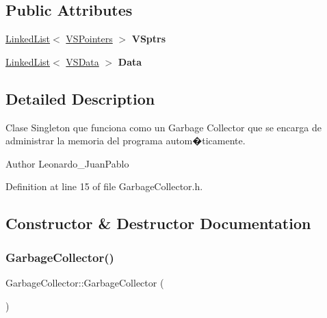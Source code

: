 \subsection*{Public Attributes}
\begin{DoxyCompactItemize}
\item 
\mbox{\label{class_garbage_collector_a1dddd648ec8351fd37c94e8b477f1971}} 
\hyperlink{class_linked_list}{Linked\+List}$<$ \hyperlink{struct_v_s_pointers}{V\+S\+Pointers} $>$ {\bfseries V\+Sptrs}
\item 
\mbox{\label{class_garbage_collector_a03fcd944fc7226109c8aa2a8ab96a741}} 
\hyperlink{class_linked_list}{Linked\+List}$<$ \hyperlink{struct_v_s_data}{V\+S\+Data} $>$ {\bfseries Data}
\end{DoxyCompactItemize}


\subsection{Detailed Description}
Clase Singleton que funciona como un Garbage Collector que se encarga de administrar la memoria del programa autom�ticamente. 

\begin{DoxyAuthor}{Author}
Leonardo\+\_\+\+Juan\+Pablo 
\end{DoxyAuthor}


Definition at line 15 of file Garbage\+Collector.\+h.



\subsection{Constructor \& Destructor Documentation}
\mbox{\label{class_garbage_collector_a78b0b35e1b0f76dc688f73cb2b7db86f}} 
\subsubsection{\texorpdfstring{Garbage\+Collector()}{GarbageCollector()}}
{\footnotesize\ttfamily Garbage\+Collector\+::\+Garbage\+Collector (\begin{DoxyParamCaption}{ }\end{DoxyParamCaption})}




